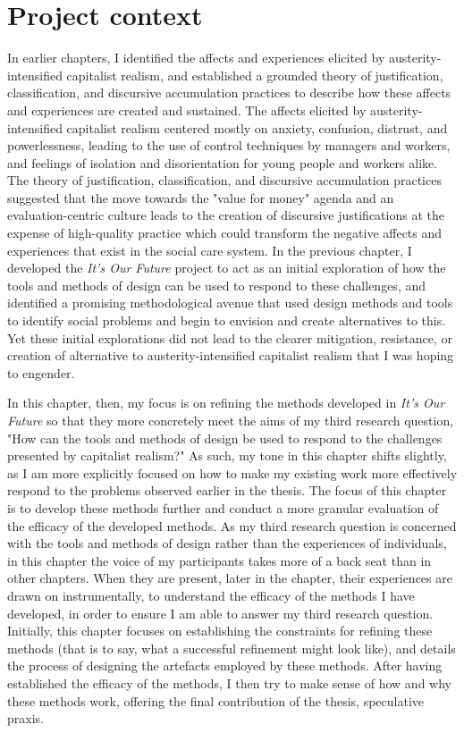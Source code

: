\section{Project context}
\label{sec:8-1-context}
In earlier chapters, I identified the affects and experiences elicited by austerity-intensified capitalist realism, and established a grounded theory of justification, classification, and discursive accumulation practices to describe how these affects and experiences are created and sustained. The affects elicited by austerity-intensified capitalist realism centered mostly on anxiety, confusion, distrust, and powerlessness, leading to the use of control techniques by managers and workers, and feelings of isolation and disorientation for young people and workers alike. The theory of justification, classification, and discursive accumulation practices suggested that the move towards the "value for money" agenda and an evaluation-centric culture leads to the creation of discursive justifications at the expense of high-quality practice which could transform the negative affects and experiences that exist in the social care system. In the previous chapter, I developed the \textit{It's Our Future} project to act as an initial exploration of how the tools and methods of design can be used to respond to these challenges, and identified a promising methodological avenue that used design methods and tools to identify social problems and begin to envision and create alternatives to this. Yet these initial explorations did not lead to the clearer mitigation, resistance, or creation of alternative to austerity-intensified capitalist realism that I was hoping to engender. 

In this chapter, then, my focus is on refining the methods developed in \textit{It's Our Future} so that they more concretely meet the aims of my third research question, "How can the tools and methods of design be used to respond to the challenges presented by capitalist realism?" As such, my tone in this chapter shifts slightly, as I am more explicitly focused on how to make my existing work more effectively respond to the problems observed earlier in the thesis. The focus of this chapter is to develop these methods further and conduct a more granular evaluation of the efficacy of the developed methods. As my third research question is concerned with the tools and methods of design rather than the experiences of individuals, in this chapter the voice of my participants takes more of a back seat than in other chapters. When they are present, later in the chapter, their experiences are drawn on instrumentally, to understand the efficacy of the methods I have developed, in order to ensure I am able to answer my third research question. Initially, this chapter focuses on establishing the constraints for refining these methods (that is to say, what a successful refinement might look like), and details the process of designing the artefacts employed by these methods. After having established the efficacy of the methods, I then try to make sense of how and why these methods work, offering the final contribution of the thesis, speculative praxis. 


